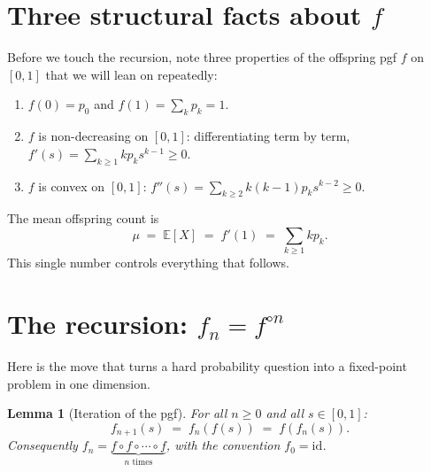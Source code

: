 \documentclass[11pt]{article}
\newtheorem{lemma}[theorem]{Lemma}
\begin{document}
\section{Three structural facts about \texorpdfstring{$f$}{f}}
Before we touch the recursion, note three properties of the offspring pgf $f$ on $[0,1]$ that we will lean on repeatedly:

\begin{enumerate}[label=(\arabic*), leftmargin=*, itemsep=2pt]
  \item $f(0) = p_0$ and $f(1) = \sum_k p_k = 1$.
  \item $f$ is non-decreasing on $[0,1]$: differentiating term by term, $f'(s) = \sum_{k \geq 1} k p_k s^{k-1} \geq 0$.
  \item $f$ is convex on $[0,1]$: $f''(s) = \sum_{k \geq 2} k(k-1) p_k s^{k-2} \geq 0$.
\end{enumerate}
The mean offspring count is
\[
\mu \;=\; \mathbb{E}[X] \;=\; f'(1) \;=\; \sum_{k \geq 1} k p_k.
\]
This single number controls everything that follows.

\section{The recursion: \texorpdfstring{$f_n = f^{\circ n}$}{fn = f circ n}}
Here is the move that turns a hard probability question into a fixed-point problem in one dimension.

\begin{lemma}[Iteration of the pgf]\label{lem:iter}
For all $n \geq 0$ and all $s \in [0, 1]$:
\[
f_{n+1}(s) \;=\; f_n\!\left(f(s)\right) \;=\; f\!\left(f_n(s)\right).
\]
Consequently $f_n = \underbrace{f \circ f \circ \cdots \circ f}_{n \text{ times}}$, with the convention $f_0 = \mathrm{id}$.
\end{lemma}
\end{document}
